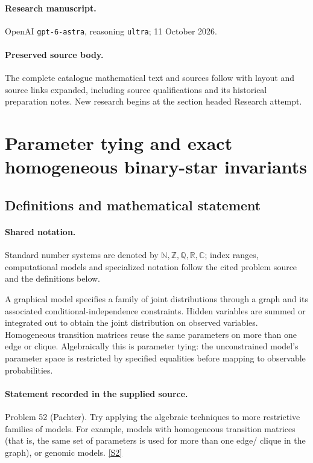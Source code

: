 \documentclass[11pt]{article}
\begin{document}
\paragraph{Research manuscript.} OpenAI \texttt{gpt-6-astra}, reasoning \texttt{ultra}; 11 October 2026.
\paragraph{Preserved source body.} The complete catalogue mathematical text and sources follow with layout and source links expanded, including source qualifications and its historical preparation notes. New research begins at the section headed Research attempt.

\section{Parameter tying and exact homogeneous binary-star invariants}\label{statement}

\subsection{Definitions and mathematical statement}

\paragraph{Shared notation.}Standard number systems are denoted by $\mathbb N,\mathbb Z,\mathbb Q,\mathbb R,\mathbb C$; index ranges, computational models and specialized notation follow the cited problem source and the definitions below.


A graphical model specifies a family of joint distributions through a graph and its associated conditional-independence constraints. Hidden variables are summed or integrated out to obtain the joint distribution on observed variables. Homogeneous transition matrices reuse the same parameters on more than one edge or clique. Algebraically this is parameter tying: the unconstrained model's parameter space is restricted by specified equalities before mapping to observable probabilities.
\paragraph{Statement recorded in the supplied source.}
Problem 52 (Pachter). Try applying the algebraic techniques to more restrictive families of models. For example, models with homogeneous transition matrices (that is, the same set of parameters is used for more than one edge/ clique in the graph), or genomic models. \href{https://aimath.org/WWN/compalgstat/compalgstat.pdf}{[S2]}
\end{document}
